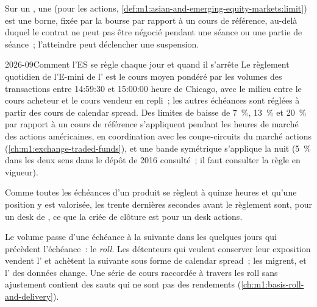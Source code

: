\begin{definition}\label{def:m1:futures-contracts-and-exchanges:limit}
Sur un , une \emph{} (pour les actions,
\cref{def:m1:asian-and-emerging-equity-markets:limit}) est une borne, fixée par la
bourse par rapport à un cours de référence, au-delà duquel le contrat ne peut
pas être négocié pendant une séance ou une partie de séance~; l'atteindre peut déclencher une suspension.
\end{definition}

\begin{dated}{2026-09}{Comment l'ES se règle chaque jour et quand il s'arrête}\label{dat:m1:futures-contracts-and-exchanges:limits}
Le règlement quotidien de l'E-mini de l' est le cours moyen pondéré par les volumes
des transactions entre 14:59:30 et 15:00:00 heure de Chicago, avec le
milieu entre le cours acheteur et le cours vendeur en repli~; les autres échéances sont réglées à partir des
cours de calendar spread. Des limites de baisse de 7~\%, 13~\% et 20~\% par rapport à un
cours de référence s'appliquent pendant les heures de marché des actions américaines, en coordination avec les
coupe-circuits du marché actions (\cref{ch:m1:exchange-traded-funds}), et une
bande symétrique s'applique la nuit (5~\% dans les deux sens dans le dépôt de 2016
consulté~; il faut consulter la règle en vigueur).
\end{dated}

Comme toutes les échéances d'un produit se règlent à quinze heures et qu'une position
y est valorisée, les trente dernières secondes avant le règlement sont, pour un
desk de , ce que la criée de clôture est pour un desk actions.

Le volume passe d'une échéance à la suivante dans les quelques jours qui précèdent l'échéance~: le
\emph{roll}. Les détenteurs qui veulent conserver leur exposition vendent l' et achètent la
suivante sous forme de calendar spread~; les  migrent, et l' des données change. Une série de cours raccordée à travers les roll sans ajustement
contient des sauts qui ne sont pas des rendements
(\cref{ch:m1:basis-roll-and-delivery}).

